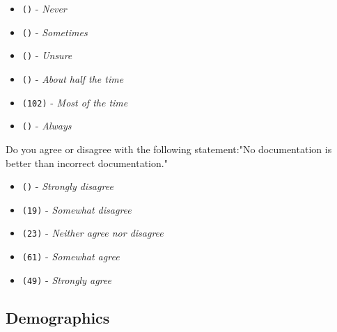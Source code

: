 \begin{protocol}
\begin{itemize}
\item \texttt{(\space {})} - \textit{Never}
\item \texttt{()} - \textit{Sometimes}
\item \texttt{()} - \textit{Unsure}
\item \texttt{()} - \textit{About half the time}
\item \texttt{(102)} - \textit{Most of the time}
\item \texttt{()} - \textit{Always}
\end{itemize}
\item \label{survey:ccq5}  Do you agree or disagree with the following statement:"No documentation is better than incorrect documentation."
\begin{itemize}
\item \texttt{()} - \textit{Strongly disagree}
\item \texttt{(19)} - \textit{Somewhat disagree}
\item \texttt{(23)} - \textit{Neither agree nor disagree}
\item \texttt{(61)} - \textit{Somewhat agree}
\item \texttt{(49)} - \textit{Strongly agree}
\end{itemize}
\end{protocol}

\subsection{Demographics}
\label{survey:sec:dq}

